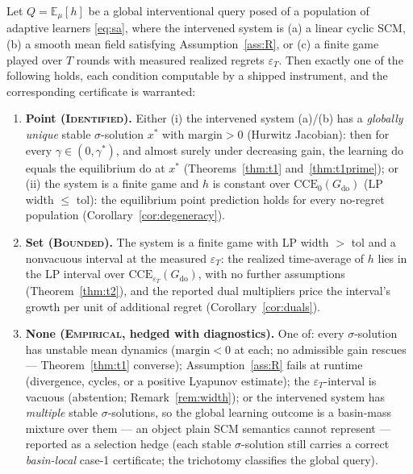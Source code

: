 \documentclass[pmlr]{jmlr}
\newcommand{\E}{\mathbb{E}}
\newcommand{\doop}{\mathrm{do}}
\newcommand{\CCE}{\mathrm{CCE}}
\newcommand{\margin}{\mathrm{margin}}
\newcommand{\gstar}{\gamma^{*}}
\newcommand{\Cid}{\textsc{Identified}}
\newcommand{\Cbd}{\textsc{Bounded}}
\newcommand{\Cem}{\textsc{Empirical}}
\begin{document}
\begin{theorem}\label{thm:main}
Let $Q = \E_\mu[h]$ be a global interventional query posed of a population of adaptive
learners \eqref{eq:sa}, where the intervened system is (a) a linear cyclic SCM, (b) a smooth mean
field satisfying Assumption~\ref{ass:R}, or (c) a finite game played over $T$ rounds with
measured realized regrets $\varepsilon_T$. Then exactly one of the following holds, each
condition computable by a shipped instrument, and the corresponding certificate is warranted:
\begin{enumerate}
\item[\textbf{1.}] \textbf{Point (\Cid).} Either (i) the intervened system \textup{(a)/(b)} has a
\emph{globally unique} stable $\sigma$-solution $x^*$ with $\margin > 0$ (Hurwitz Jacobian):
then for every $\gamma \in (0, \gstar)$, and almost surely under decreasing gain, the learning
$\doop$ equals the equilibrium $\doop$ at $x^*$ (Theorems~\ref{thm:t1} and~\ref{thm:t1prime});
or (ii) the system is a finite game and $h$ is constant over $\CCE_0(G_{\doop})$ (LP width
$\leq$ tol): the equilibrium point prediction holds for every no-regret population
(Corollary~\ref{cor:degeneracy}).
\item[\textbf{2.}] \textbf{Set (\Cbd).} The system is a finite game with LP width $>$ tol and a
nonvacuous interval at the measured $\varepsilon_T$: the realized time-average of $h$ lies
in the LP interval over $\CCE_{\varepsilon_T}(G_{\doop})$, with no further assumptions
(Theorem~\ref{thm:t2}), and the reported dual multipliers price the interval's growth per unit
of additional regret (Corollary~\ref{cor:duals}).
\item[\textbf{3.}] \textbf{None (\Cem, hedged with diagnostics).} One of: every $\sigma$-solution
has unstable mean dynamics ($\margin < 0$ at each; no admissible gain rescues ---
Theorem~\ref{thm:t1} converse); Assumption~\ref{ass:R} fails at runtime (divergence, cycles, or a
positive Lyapunov estimate); the $\varepsilon_T$-interval is vacuous (abstention;
Remark~\ref{rem:width}); or the intervened system has \emph{multiple} stable $\sigma$-solutions,
so the global learning outcome is a basin-mass mixture over them --- an object plain SCM
semantics cannot represent \citep{blom2019beyond} --- reported as a selection hedge (each
stable $\sigma$-solution still carries a correct \emph{basin-local} case-1 certificate; the
trichotomy classifies the global query).
\end{enumerate}
\end{theorem}
\end{document}
